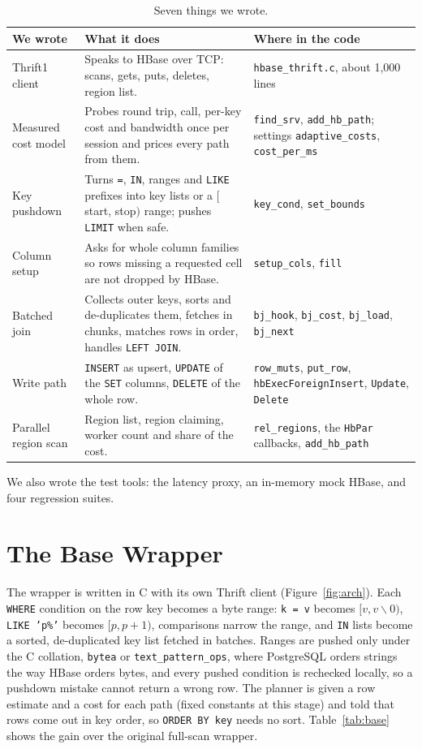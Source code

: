 \documentclass[11pt,a4paper]{article}
\newcommand{\code}[1]{\texttt{#1}}
\begin{document}
\begin{table}[htbp]
\centering\small
\caption{Seven things we wrote.}
\label{tab:wrote}
\begin{tabularx}{\textwidth}{@{}>{\raggedright\arraybackslash}p{}>{\raggedright\arraybackslash}X>{\raggedright\arraybackslash}X@{}}
\toprule
\textbf{We wrote} & \textbf{What it does} & \textbf{Where in the code}\\
\midrule
Thrift1 client & Speaks to HBase over TCP: scans, gets, puts, deletes, region list. & \code{hbase\_thrift.c}, about 1{,}000 lines\\
Measured cost model & Probes round trip, call, per-key cost and bandwidth once per session and prices every path from them. & \code{find\_srv}, \code{add\_hb\_path}; settings \code{adaptive\_costs}, \code{cost\_per\_ms}\\
Key pushdown & Turns \code{=}, \code{IN}, ranges and \code{LIKE} prefixes into key lists or a $[$start, stop$)$ range; pushes \code{LIMIT} when safe. & \code{key\_cond}, \code{set\_bounds}\\
Column setup & Asks for whole column families so rows missing a requested cell are not dropped by HBase. & \code{setup\_cols}, \code{fill}\\
Batched join & Collects outer keys, sorts and de-duplicates them, fetches in chunks, matches rows in order, handles \code{LEFT JOIN}. & \code{bj\_hook}, \code{bj\_cost}, \code{bj\_load}, \code{bj\_next}\\
Write path & \code{INSERT} as upsert, \code{UPDATE} of the \code{SET} columns, \code{DELETE} of the whole row. & \code{row\_muts}, \code{put\_row}, \code{hbExecForeignInsert}, \code{Update}, \code{Delete}\\
Parallel region scan & Region list, region claiming, worker count and share of the cost. & \code{rel\_regions}, the \code{HbPar} callbacks, \code{add\_hb\_path}\\
\bottomrule
\end{tabularx}
\end{table}

We also wrote the test tools: the latency proxy, an in-memory mock HBase, and four regression suites.

\section{The Base Wrapper}
\label{sec:base}
The wrapper is written in C with its own Thrift client (Figure~\ref{fig:arch}). Each \code{WHERE} condition on the row key becomes a byte range: \code{k = v} becomes $[v, v\backslash0)$, \code{LIKE 'p\%'} becomes $[p, p{+}1)$, comparisons narrow the range, and \code{IN} lists become a sorted, de-duplicated key list fetched in batches. Ranges are pushed only under the C collation, \code{bytea} or \code{text\_pattern\_ops}, where PostgreSQL orders strings the way HBase orders bytes, and every pushed condition is rechecked locally, so a pushdown mistake cannot return a wrong row. The planner is given a row estimate and a cost for each path (fixed constants at this stage) and told that rows come out in key order, so \code{ORDER BY key} needs no sort. Table~\ref{tab:base} shows the gain over the original full-scan wrapper.
\end{document}
